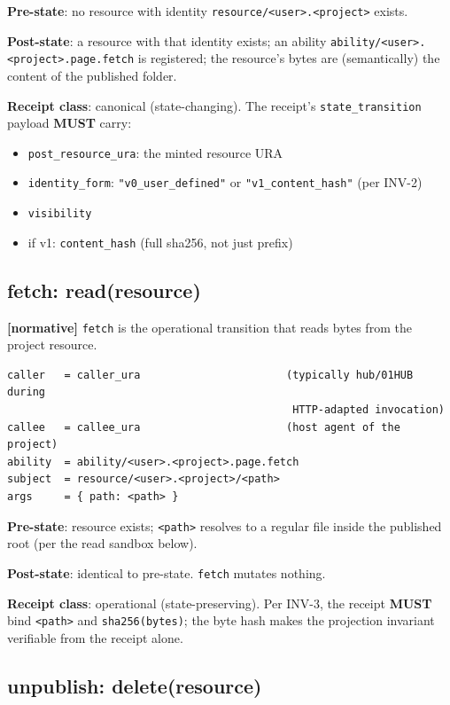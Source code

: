 \documentclass[11pt,a4paper]{article}
\newcommand{\normsv}{\textcolor{normativecolor}{\textbf{[normative]}}\xspace}
\theoremstyle{definition}
\begin{document}
\textbf{Pre-state}: no resource with identity
\texttt{resource/<user>.<project>} exists.

\textbf{Post-state}: a resource with that identity exists; an
ability \texttt{ability/<user>.<project>.page.fetch} is
registered; the resource's bytes are (semantically) the
content of the published folder.

\textbf{Receipt class}: canonical (state-changing). The
receipt's \texttt{state\_transition} payload \textbf{MUST}
carry:

\begin{itemize}[leftmargin=2em,itemsep=0.1em]
    \item \texttt{post\_resource\_ura}: the minted resource URA
    \item \texttt{identity\_form}: \texttt{"v0\_user\_defined"}
    or \texttt{"v1\_content\_hash"} (per INV-2)
    \item \texttt{visibility}
    \item if v1: \texttt{content\_hash} (full sha256, not just prefix)
\end{itemize}

\subsection{fetch: read(resource)}

\normsv{} \texttt{fetch} is the operational transition that
reads bytes from the project resource.

\begin{lstlisting}
caller   = caller_ura                       (typically hub/01HUB during
                                             HTTP-adapted invocation)
callee   = callee_ura                       (host agent of the project)
ability  = ability/<user>.<project>.page.fetch
subject  = resource/<user>.<project>/<path>
args     = { path: <path> }
\end{lstlisting}

\textbf{Pre-state}: resource exists; \texttt{<path>} resolves
to a regular file inside the published root (per the read
sandbox below).

\textbf{Post-state}: identical to pre-state. \texttt{fetch}
mutates nothing.

\textbf{Receipt class}: operational (state-preserving). Per
INV-3, the receipt \textbf{MUST} bind \texttt{<path>} and
\texttt{sha256(bytes)}; the byte hash makes the projection
invariant verifiable from the receipt alone.

\subsection{unpublish: delete(resource)}
\end{document}
